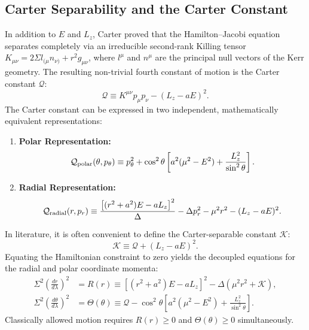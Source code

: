 \subsection{Carter Separability and the Carter Constant}
In addition to $E$ and $L_z$, Carter \cite{Carter1968} proved that the Hamilton--Jacobi equation separates completely via an irreducible second-rank Killing tensor $K_{\mu\nu} = 2\Sigma l_{(\mu} n_{\nu)} + r^2 g_{\mu\nu}$, where $l^\mu$ and $n^\mu$ are the principal null vectors of the Kerr geometry. The resulting non-trivial fourth constant of motion is the Carter constant $\mathcal{Q}$:
\begin{equation}
    \mathcal{Q} \equiv K^{\mu\nu} p_\mu p_\nu - (L_z - aE)^2.
\end{equation}
The Carter constant can be expressed in two independent, mathematically equivalent representations:
\begin{enumerate}
    \item \textbf{Polar Representation:}
    \begin{equation}
        \mathcal{Q}_{\rm polar}(\theta, p_\theta) \equiv p_\theta^2 + \cos^2\theta \left[ a^2(\mu^2 - E^2) + \frac{L_z^2}{\sin^2\theta} \right].
        \label{eq:carter_polar_rep}
    \end{equation}
    \item \textbf{Radial Representation:}
    \begin{equation}
        \mathcal{Q}_{\rm radial}(r, p_r) \equiv \frac{\left[(r^2 + a^2)E - a L_z\right]^2}{\Delta} - \Delta p_r^2 - \mu^2 r^2 - (L_z - aE)^2.
        \label{eq:carter_radial_rep}
    \end{equation}
\end{enumerate}
In literature, it is often convenient to define the Carter-separable constant $\mathcal{K}$:
\begin{equation}
    \mathcal{K} \equiv \mathcal{Q} + (L_z - aE)^2.
    \label{eq:carter_k_def}
\end{equation}
Equating the Hamiltonian constraint to zero yields the decoupled equations for the radial and polar coordinate momenta:
\begin{align}
    \Sigma^2 \left(\frac{dr}{d\lambda}\right)^2 &= R(r) \equiv \left[(r^2 + a^2)E - a L_z\right]^2 - \Delta \left( \mu^2 r^2 + \mathcal{K} \right), \label{eq:radial_potential_R} \\
    \Sigma^2 \left(\frac{d\theta}{d\lambda}\right)^2 &= \Theta(\theta) \equiv \mathcal{Q} - \cos^2\theta \left[ a^2(\mu^2 - E^2) + \frac{L_z^2}{\sin^2\theta} \right]. \label{eq:polar_potential_Theta}
\end{align}
Classically allowed motion requires $R(r) \ge 0$ and $\Theta(\theta) \ge 0$ simultaneously.

